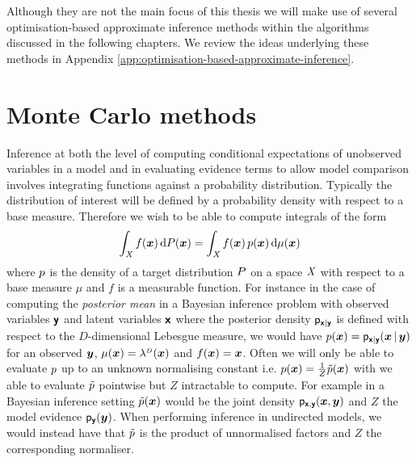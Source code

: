 Although they are not the main focus of this thesis we will make use of several optimisation-based approximate inference methods within the algorithms discussed in the following chapters. We review the ideas underlying these methods in Appendix \ref{app:optimisation-based-approximate-inference}. 

\section{Monte Carlo methods}

Inference at both the level of computing conditional expectations of unobserved variables in a model and in evaluating evidence terms to allow model comparison involves integrating functions against a probability distribution. Typically the distribution of interest will be defined by a probability density with respect to a base measure. Therefore we wish to be able to compute integrals of the form
\begin{equation}\label{eq:integral-against-density}
  \int_{\mathit{X}} f(\boldsymbol{x}) \, \mathrm{d} P(\boldsymbol{x}) =
  \int_{\mathit{X}} f(\boldsymbol{x}) \, p(\boldsymbol{x}) \,\mathrm{d}\mu(\boldsymbol{x})
\end{equation}
where $p$ is the density of a target distribution $P$ on a space $\mathit{X}$ with respect to a base measure $\mu$ and $f$ is a measurable function. For instance in the case of computing the \emph{posterior mean} in a Bayesian inference problem with observed variables $\boldsymbol{\mathsf{y}}$ and latent variables $\boldsymbol{\mathsf{x}}$ where the posterior density $\mathsf{p}_{\boldsymbol{\mathsf{x}}|\boldsymbol{\mathsf{y}}}$ is defined with respect to the $D$-dimensional Lebesgue measure, we would have  $p(\boldsymbol{x}) = \mathsf{p}_{\boldsymbol{\mathsf{x}}|\boldsymbol{\mathsf{y}}}(\boldsymbol{x}\operatorname{|}\boldsymbol{y})$ for an observed $\boldsymbol{y}$, $\mu(\vct{x}) = \lebm{D}(\vct{x})$ and $f(\boldsymbol{x}) = \boldsymbol{x}$. Often we will only be able to evaluate $p$ up to an unknown normalising constant i.e. $p(\boldsymbol{x}) = \frac{1}{Z}\tilde{p}(\boldsymbol{x})$ with we able to evaluate $\tilde{p}$ pointwise but $Z$ intractable to compute. For example in a Bayesian inference setting $\tilde{p}(\boldsymbol{x})$ would be the joint density $\mathsf{p}_{\boldsymbol{\mathsf{x}},\boldsymbol{\mathsf{y}}}(\boldsymbol{x},\boldsymbol{y})$ and $Z$ the model evidence $\mathsf{p}_{\boldsymbol{\mathsf{y}}}(\boldsymbol{y})$. When performing inference in undirected models, we would instead have that $\tilde{p}$ is the product of unnormalised factors and $Z$ the corresponding normaliser.


